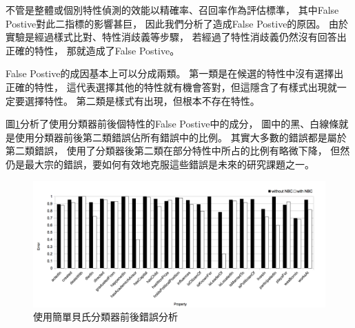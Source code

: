 不管是整體或個別特性偵測的效能以精確率、召回率作為評估標準，
其中False Postive對此二指標的影響甚巨，
因此我們分析了造成False Postive的原因。
由於實驗是經過樣式比對、特性消歧義等步驟，
若經過了特性消歧義仍然沒有回答出正確的特性，
那就造成了False Postive。

False Postive的成因基本上可以分成兩類。
第一類是在候選的特性中沒有選擇出正確的特性，
這代表選擇其他的特性就有機會答對，但這隱含了有樣式出現就一定要選擇特性。
第二類是樣式有出現，但根本不存在特性。

圖\ref{i:error}分析了使用分類器前後個特性的False Postive中的成分，
圖中的黑、白線條就是使用分類器前後第二類錯誤佔所有錯誤中的比例。
其實大多數的錯誤都是屬於第二類錯誤，
使用了分類器後第二類在部分特性中所占的比例有略微下降，
但然仍是最大宗的錯誤，要如何有效地克服這些錯誤是未來的研究課題之一。

\begin{figure}[h]
    \centering
    \includegraphics[width=\textwidth]{images/04-error}
    \caption{使用簡單貝氏分類器前後錯誤分析}
    \label{i:error}
\end{figure}

